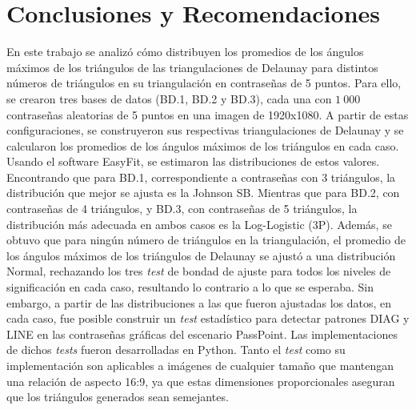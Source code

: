 \documentclass[12pt]{report}
\begin{document}
\chapter*{Conclusiones y Recomendaciones }
En este trabajo se analizó cómo distribuyen los promedios de los ángulos máximos de los triángulos de las triangulaciones de Delaunay para distintos números de triángulos en su triangulación en contraseñas de 5 puntos. Para ello, se crearon tres bases de datos (BD.1, BD.2 y BD.3), cada una con $1\ 000$ contraseñas aleatorias de 5 puntos en una imagen de 1920x1080. A partir de estas configuraciones, se construyeron sus respectivas triangulaciones de Delaunay y se calcularon los promedios de los ángulos máximos de los triángulos en cada caso. Usando el software EasyFit, se estimaron las distribuciones de estos valores. Encontrando que para BD.1, correspondiente a contraseñas con 3 triángulos, la distribución que mejor se ajusta es la Johnson SB. Mientras que para BD.2, con contraseñas de 4 triángulos, y BD.3, con contraseñas de 5 triángulos, la distribución más adecuada en ambos casos es la Log-Logistic (3P). Además, se obtuvo que para ningún número de  triángulos en la triangulación, el promedio de los ángulos máximos de los triángulos de Delaunay  se ajustó a una distribución Normal, rechazando los tres \textit{test} de bondad de ajuste para todos los niveles de significación en cada caso, resultando lo contrario a lo que se esperaba. Sin embargo, a partir de las distribuciones a las que fueron ajustadas los datos, en cada caso, fue posible construir un \textit{test} estadístico para detectar patrones DIAG y LINE en las contraseñas gráficas del escenario PassPoint. Las implementaciones de dichos \textit{tests} fueron desarrolladas en Python. Tanto el \textit{test} como su implementación son aplicables a imágenes de cualquier tamaño que mantengan una relación de aspecto 16:9, ya que estas dimensiones proporcionales aseguran que los triángulos generados sean semejantes. 
\end{document}

